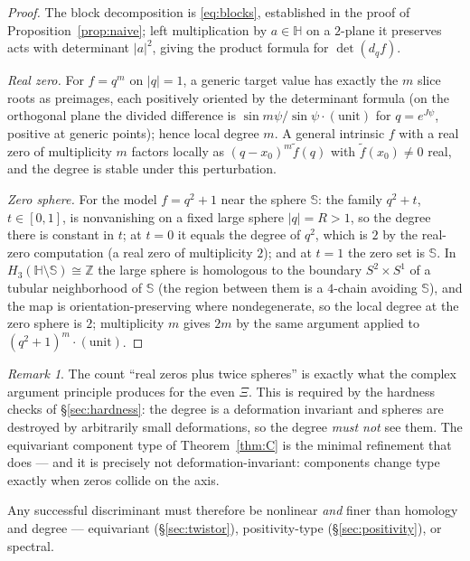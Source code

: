 \documentclass[11pt]{amsart}
\theoremstyle{plain}
\theoremstyle{definition}
\theoremstyle{remark}
\newtheorem{remark}[theorem]{Remark}
\newcommand{\HH}{\mathbb{H}}
\newcommand{\ZZ}{\mathbb{Z}}
\renewcommand{\SS}{\mathbb{S}}
\begin{document}
\begin{proof}
The block decomposition is \eqref{eq:blocks}, established in the proof of
Proposition~\ref{prop:naive}; left multiplication by $a\in\HH$ on a $2$-plane it preserves acts
with determinant $|a|^2$, giving the product formula for $\det(d_qf)$.

\emph{Real zero.} For $f=q^m$ on $|q|=1$, a generic target value has exactly the $m$ slice roots
as preimages, each positively oriented by the determinant formula (on the orthogonal plane the
divided difference is $\sin m\psi/\sin\psi\cdot(\text{unit})$ for $q=e^{J\psi}$, positive at
generic points); hence local degree $m$. A general intrinsic $f$ with a real zero of multiplicity
$m$ factors locally as $(q-x_0)^m\tilde f(q)$ with $\tilde f(x_0)\neq0$ real, and the degree is
stable under this perturbation.

\emph{Zero sphere.} For the model $f=q^2+1$ near the sphere $\SS$: the family $q^2+t$,
$t\in[0,1]$, is nonvanishing on a fixed large sphere $|q|=R>1$, so the degree there is constant
in $t$; at $t=0$ it equals the degree of $q^2$, which is $2$ by the real-zero computation (a real
zero of multiplicity $2$); and at $t=1$ the zero set is $\SS$. In
$H_3(\HH\setminus\SS)\cong\ZZ$ the large sphere is homologous to the boundary $S^2\times S^1$ of
a tubular neighborhood of $\SS$ (the region between them is a $4$-chain avoiding $\SS$), and the
map is orientation-preserving where nondegenerate, so the local degree at the zero sphere is
$2$; multiplicity $m$ gives $2m$ by the same argument applied to
$(q^2+1)^m\cdot(\text{unit})$.
\end{proof}

\begin{remark}
The count ``real zeros plus twice spheres'' is exactly what the complex argument principle
produces for the even $\Xi$. This is required by the hardness checks of \S\ref{sec:hardness}:
the degree is a deformation invariant and spheres are destroyed by arbitrarily small
deformations, so the degree \emph{must not} see them. The equivariant component type of
Theorem~\ref{thm:C} is the minimal refinement that does --- and it is precisely not
deformation-invariant: components change type exactly when zeros collide on the axis.
\end{remark}

Any successful discriminant must therefore be nonlinear \emph{and} finer than homology and degree
--- equivariant (\S\ref{sec:twistor}), positivity-type (\S\ref{sec:positivity}), or spectral.
\end{document}
